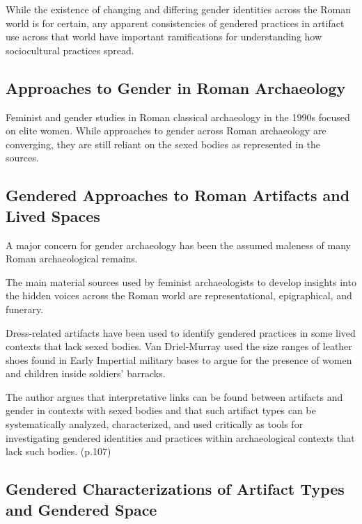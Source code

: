 \begin{rmk}
    While the existence of changing and differing gender identities across the Roman world is for certain, any apparent consistencies of gendered practices in artifact use across that world have important ramifications for understanding how sociocultural practices spread.
\end{rmk}


\subsection{Approaches to Gender in Roman Archaeology}

Feminist and gender studies in Roman classical archaeology in the 1990s focused on elite women. While approaches to gender across Roman archaeology are converging, they are still reliant on the sexed bodies as represented in the sources.


\subsection{Gendered Approaches to Roman Artifacts and Lived Spaces}

A major concern for gender archaeology has been the assumed maleness of many Roman archaeological remains. 

\begin{nte}
    The main material sources used by feminist archaeologists to develop insights into the hidden voices across the Roman world are representational, epigraphical, and funerary.
\end{nte}

Dress-related artifacts have been used to identify gendered practices in some lived contexts that lack sexed bodies. Van Driel-Murray used the size ranges of leather shoes found in Early Impertial military bases to argue for the presence of women and children inside soldiers' barracks.

\begin{rmk}
    The author argues that interpretative links can be found between artifacts and gender in contexts with sexed bodies and that such artifact types can be systematically analyzed, characterized, and used critically as tools for investigating gendered identities and practices within archaeological contexts that lack such bodies. (p.107)
\end{rmk}


\subsection{Gendered Characterizations of Artifact Types and Gendered Space}

